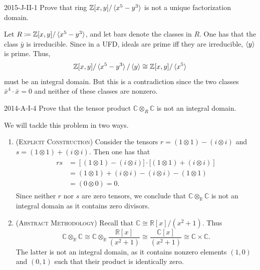 \documentclass{article}
\begin{document}
	\begin{prb}{2015-J-II-1}
		Prove that ring $\mathbb{Z}[x,y]/\braket{x^{5} - y^{3}}$ is not a unique factorization domain. 
	\end{prb}
	Let $R \coloneqq \mathbb{Z}[x,y]/\braket{x^{5} - y^{3}}$, and let bars denote the classes in $R$. One has that the class $\bar{y}$ is irreducible. Since in a UFD, ideals are prime iff they are irreducible, $\braket{y}$ is prime. Thus, 
	\begin{equation*}
		\mathbb{Z}[x,y]/\braket{x^{5} - y^{3}}/\braket{y} \cong \mathbb{Z}[x,y]/\braket{x^{5}} 
	\end{equation*}
	must be an integral domain. But this is a contradiction since the two classes $\bar{x}^{4} \cdot \bar{x} = 0$ and neither of these classes are nonzero.
	
	\begin{prb}{2014-A-I-4}
		Prove that the tensor product $\mathbb{C} \otimes_{R} \mathbb{C}$ is not an integral domain. 
	\end{prb} 
	We will tackle this problem in two ways. \vspace{-0.25cm}
	\begin{enumerate}[itemsep =-2pt,label = (\arabic{*})]
		\item (\textsc{Explicit Construction}) Consider the tensors $r = (1 \otimes 1) - (i \otimes i)$ and $s = (1 \otimes 1) + (i \otimes i)$. Then one has that 
		\begin{align*}
			\begin{split}
				rs &= \left[(1 \otimes 1) - (i \otimes i)] \cdot [(1 \otimes 1) + (i \otimes i)\right] \\
				&= (1 \otimes 1) + (i \otimes i) - (i \otimes i) - (1 \otimes 1) \\
				&= (0 \otimes 0)= 0. 
			\end{split}
		\end{align*}
		Since neither $r$ nor $s$ are zero tensors, we conclude that $\mathbb{C} \otimes_{\mathbb{R}} \mathbb{C}$ is not an integral domain as it contains zero divisors. 
		\item (\textsc{Abstract Methodology}) Recall that $\mathbb{C} \cong \mathbb{R}[x]/(x^{2} + 1)$. Thus 
		\begin{equation*}
			\mathbb{C} \otimes_{\mathbb{R}}\mathbb{C} \cong \mathbb{C} \otimes_{\mathbb{R}}\frac{\mathbb{R}[x]}{(x^{2}  + 1)} \cong \frac{\mathbb{C}[x]}{(x^{2} + 1)} \cong \mathbb{C} \times \mathbb{C}. 
		\end{equation*}
		The latter is not an integral domain, as it contains nonzero elements $(1,0)$ and $(0,1)$ such that their product is identically zero. 
	\end{enumerate}
	
\end{document}
